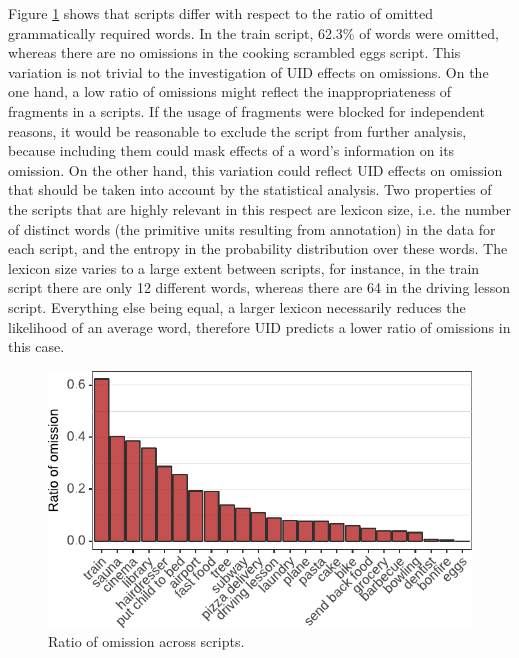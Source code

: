 Figure \ref{fig:scripts-ellratio} shows that scripts differ with respect to the ratio of omitted grammatically required words. In the train script, 62.3\% of words were omitted, where\-as there are no omissions in the cooking scrambled eggs script. This variation is not trivial to the investigation of UID effects on omissions. On the one hand, a low ratio of omissions might reflect the inappropriateness of fragments in a scripts. If the usage of fragments were blocked for independent reasons, it would be reasonable to exclude the script from further analysis, because including them could mask effects of a word's information on its omission. On the other hand, this variation could reflect UID effects on omission that should be taken into account by the statistical analysis. Two properties of the scripts that are highly relevant in this respect are lexicon size, i.e. the number of distinct words (the primitive units resulting from annotation) in the data for each script, and the entropy in the probability distribution over these words. The lexicon size varies to a large extent between scripts, for instance, in the train script there are only 12 different words, whereas there are 64 in the driving lesson script. Everything else being equal, a larger lexicon necessarily reduces the likelihood of an average word, therefore UID predicts a lower ratio of omissions in this case.

\begin{figure}
 \includegraphics{figures/scr_production_omission_ratio}
 \caption{Ratio of omission across scripts.\label{fig:scripts-ellratio}}
\end{figure}



